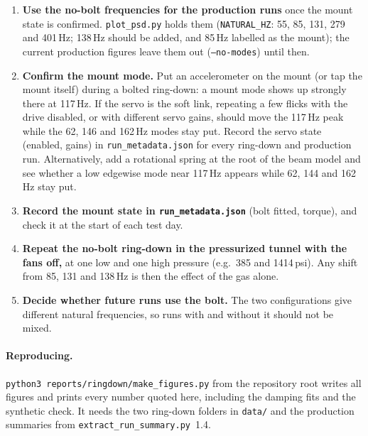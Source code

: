 \documentclass[11pt]{article}
\newcommand{\code}[1]{\texttt{#1}}
\begin{document}
\begin{enumerate}
  \item \textbf{Use the no-bolt frequencies for the production runs} once the
        mount state is confirmed. \code{plot\_psd.py} holds them
        (\code{NATURAL\_HZ}: 55, 85, 131, 279 and 401\,Hz; 138\,Hz should be
        added, and 85\,Hz labelled as the mount); the current production
        figures leave them out (\code{--no-modes}) until then.
  \item \textbf{Confirm the mount mode.} Put an accelerometer on the mount
        (or tap the mount itself) during a bolted ring-down: a mount mode
        shows up strongly there at 117\,Hz. If the servo is the soft link,
        repeating a few flicks with the drive disabled, or with different
        servo gains, should move the 117\,Hz peak while the 62, 146 and
        162\,Hz modes stay put. Record the servo state (enabled, gains) in
        \code{run\_metadata.json} for every ring-down and production run. Alternatively, add a rotational
        spring at the root of the beam model and see whether a low edgewise
        mode near 117\,Hz appears while 62, 144 and 162\,Hz stay put.
  \item \textbf{Record the mount state in \code{run\_metadata.json}} (bolt
        fitted, torque), and check it at the start of each test day.
  \item \textbf{Repeat the no-bolt ring-down in the pressurized tunnel with
        the fans off,} at one low and one high pressure (e.g.\ 385 and
        1414\,psi). Any shift from 85, 131 and 138\,Hz is then the effect of the
        gas alone.
  \item \textbf{Decide whether future runs use the bolt.} The two
        configurations give different natural frequencies, so runs with and
        without it should not be mixed.
\end{enumerate}

\paragraph{Reproducing.} \code{python3 reports/ringdown/make\_figures.py}
from the repository root writes all figures and prints every number quoted
here, including the damping fits and the synthetic check. It needs the two ring-down folders in \code{data/} and the production
summaries from \code{extract\_run\_summary.py}~1.4.
\end{document}
